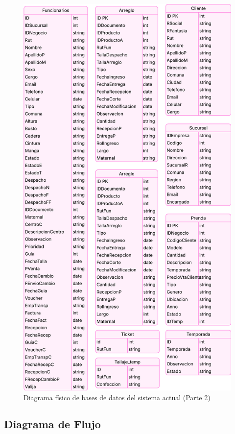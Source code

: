\begin{figure}[htbp]
    \centering
    \includegraphics[height=0.7\textheight]{figuras/diagramas-actuales/diagrama-bdd-2}
    \caption{Diagrama físico de bases de datos del sistema actual (Parte 2)}
    \label{fig:diagrama-bdd-2-actual}
\end{figure}


\subsection{Diagrama de Flujo}


